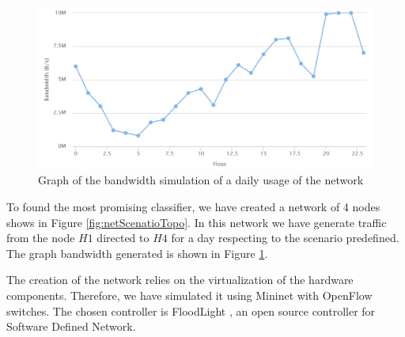 \documentclass[12pt]{article}
\begin{document}
\begin{figure}[h!]
	\centering
	\includegraphics[width=1\textwidth]{img/networkScenario.png}
	\caption[]
	{Graph of the bandwidth simulation of a daily usage of the network}
	\label{fig:netScenarioConf}
\end{figure}


To found the most promising classifier, we have created a network of 4 nodes shows in Figure \ref{fig:netScenatioTopo}.
In this network we have generate traffic from the node $H1$ directed to $H4$ for a day respecting to the scenario predefined. The graph bandwidth generated is shown in Figure \ref{fig:netScenarioConf}.

The creation of the network relies on the virtualization of the hardware components.
Therefore, we have simulated it using Mininet \cite{mininet} with OpenFlow \cite{openflow} switches.
The chosen controller is FloodLight \cite{floodlight}, an open source controller for Software Defined Network.
\end{document}
